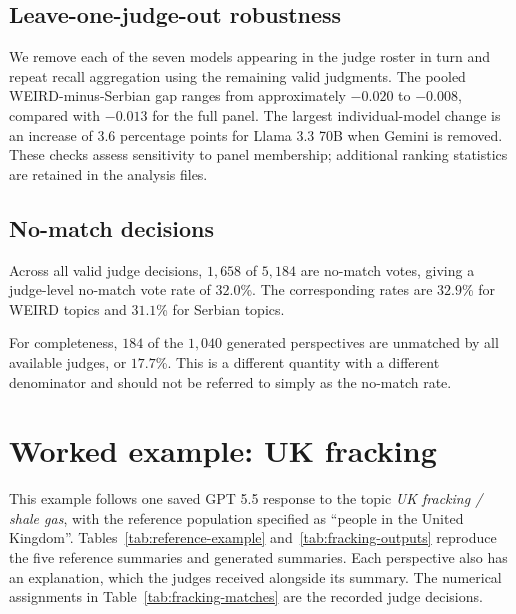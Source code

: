 \documentclass[11pt,a4paper]{article}
\begin{document}
\subsection{Leave-one-judge-out robustness}
\label{app:lojo}
We remove each of the seven models appearing in the judge roster in turn and repeat recall aggregation using the remaining valid judgments. The pooled WEIRD-minus-Serbian gap ranges from approximately $-0.020$ to $-0.008$, compared with $-0.013$ for the full panel. The largest individual-model change is an increase of $3.6$ percentage points for Llama 3.3 70B when Gemini is removed. These checks assess sensitivity to panel membership; additional ranking statistics are retained in the analysis files.

\subsection{No-match decisions}
\label{app:no_match}

Across all valid judge decisions, $1,658$ of $5,184$ are no-match votes, giving a judge-level no-match vote rate of $32.0$\%. The corresponding rates are $32.9$\% for WEIRD topics and $31.1$\% for Serbian topics.

For completeness, $184$ of the $1,040$ generated perspectives are unmatched by all available judges, or $17.7$\%. This is a different quantity with a different denominator and should not be referred to simply as the no-match rate.

\section{Worked example: UK fracking}
\label{app:worked-example}
This example follows one saved GPT 5.5 response to the topic \emph{UK fracking / shale gas}, with the reference population specified as ``people in the United Kingdom''. Tables~\ref{tab:reference-example} and~\ref{tab:fracking-outputs} reproduce the five reference summaries and generated summaries. Each perspective also has an explanation, which the judges received alongside its summary. The numerical assignments in Table~\ref{tab:fracking-matches} are the recorded judge decisions.
\end{document}
